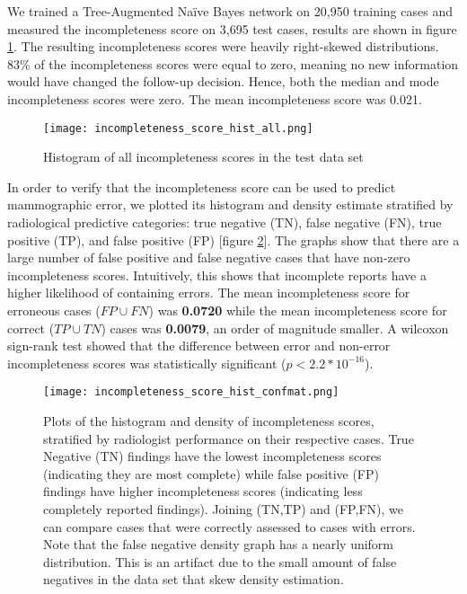 We trained a Tree-Augmented Na\"{i}ve Bayes network on 20,950 training cases and measured the incompleteness score on 3,695 test cases, results are shown in figure \ref{fig:incompleteness_score_hist_all}. The resulting incompleteness scores were heavily right-skewed distributions. 83\% of the incompleteness scores were equal to zero, meaning no new information would have changed the follow-up decision. Hence, both the median and mode incompleteness scores were zero. The mean incompleteness score was 0.021.

\begin{figure}[h!]
\centering
\texttt{[image: incompleteness\_score\_hist\_all.png]}
\caption{Histogram of all incompleteness scores in the test data set}
\label{fig:incompleteness_score_hist_all}
\end{figure}


In order to verify that the incompleteness score can be used to predict mammographic error, we plotted its histogram and density estimate stratified by radiological predictive categories: true negative (TN), false negative (FN), true positive (TP), and false positive (FP) [figure \ref{fig:incompleteness_score_hist_confmat}]. The graphs show that there are a large number of false positive and false negative cases that have non-zero incompleteness scores. Intuitively, this shows that incomplete reports have a higher likelihood of containing errors. The mean incompleteness score for erroneous cases ($FP \cup FN$) was \textbf{0.0720} while the mean incompleteness score for correct ($TP \cup TN$) cases was \textbf{0.0079}, an order of magnitude smaller. A wilcoxon sign-rank test showed that the difference between error and non-error incompleteness scores was statistically significant ($p < 2.2*10^{-16}$).

\begin{figure}
\centering
\texttt{[image: incompleteness\_score\_hist\_confmat.png]}
\caption[Incompleteness scores stratified by confusion matrix]{Plots of the histogram and density of incompleteness scores, stratified by radiologist performance on their respective cases. True Negative (TN) findings have the lowest incompleteness scores (indicating they are most complete) while false positive (FP) findings have higher incompleteness scores (indicating less completely reported findings). Joining (TN,TP) and (FP,FN), we can compare cases that were correctly assessed to cases with errors. Note that the false negative density graph has a nearly uniform distribution. This is an artifact due to the small amount of false negatives in the data set that skew density estimation.}
\label{fig:incompleteness_score_hist_confmat}
\end{figure}


